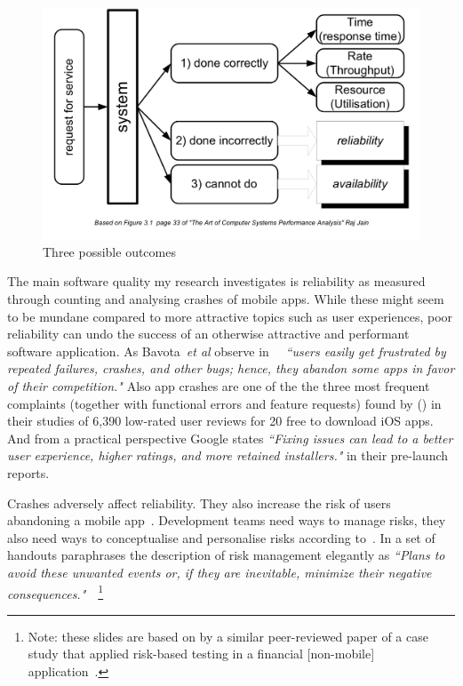 \begin{figure}[htbp!]
    \centering
    \includegraphics[width=14cm]{images/commercetest/raj-jain-performance-reliability-availability.png}
    \caption{Three possible outcomes}
    \label{fig:three-possible-ourcomes}
\end{figure}

The main software quality my research investigates is reliability as measured through counting and analysing crashes of mobile apps. While these might seem to be mundane compared to more attractive topics such as user experiences, poor reliability can undo the success of an otherwise attractive and performant software application. As Bavota~\emph{et al} observe in~\cite{bavota2014_impact_of_api_change_android} ~\emph{``users easily get frustrated by repeated failures, crashes, and other bugs; hence, they abandon some apps in favor of their competition."} Also app crashes are one of the the three most frequent complaints (together with functional errors and feature requests) found by (\cite{khalid2015_what_do_mobile_app_users_complain_about}) in their studies of 6,390 low-rated user reviews for 20 free to download iOS apps. And from a practical perspective Google states \emph{``Fixing issues can lead to a better user experience, higher ratings, and more retained installers."} in their pre-launch reports.

Crashes adversely affect reliability. They also increase the risk of users abandoning a mobile app~\citep{dimensionalresearch2015_mobile_app_use_and_abandonment}. Development teams need ways to manage risks, they also need ways to conceptualise and personalise risks according to~\citep{pfleeger2000_risky_business}. In a set of handouts paraphrases the description of risk management elegantly as \textit{``Plans to avoid these unwanted events or, if they are inevitable, minimize their negative consequences."}~\citep{amland2002_slides}~\footnote{Note: these slides are based on by a similar peer-reviewed paper of a case study that applied risk-based testing in a financial [non-mobile] application~\citep{Amland_2000_rbt_financial_case_study}.}


